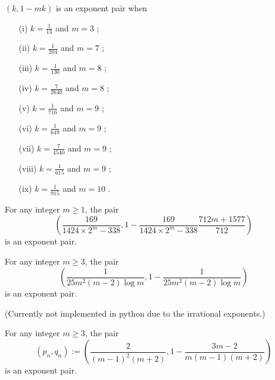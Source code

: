 \begin{theorem}\label{exp_pair_deriv_test} $(k,1-mk)$ is an exponent pair when
    \begin{itemize}
\item[(i)] $k=\frac{1}{13}$ and $m=3$ \cite[Theorem 1]{robert_fourth_2002};
\item[(ii)] $k = \frac{1}{204}$ and $m=7$ \cite[p. 231]{sargos_analog_2003};
\item[(iii)] $k = \frac{1}{130}$ and $m=8$ \cite[(1.1)]{robert_2002};
\item[(iv)] $k = \frac{7}{2640}$ and $m=8$ \cite[p. 231]{sargos_analog_2003};
\item[(v)] $k = \frac{1}{716}$ and $m=9$ \cite[p. 231]{sargos_analog_2003};
\item[(vi)] $k = \frac{1}{649}$ and $m=9$ \cite{Robert_Sargos_2001};
\item[(vii)] $k = \frac{7}{4540}$ and $m=9$ \cite[(1.2)]{robert_2002};
\item[(viii)] $k = \frac{1}{615}$ and $m=9$ \cite[(1.1)]{robert_2002};
\item[(ix)] $k = \frac{1}{915}$ and $m=10$ \cite[Th\'eor\`eme 2]{robert_2002b}.
\end{itemize}
\end{theorem}

\literature
{}


\begin{theorem}\label{huxley_exp_pair}\cite[Table 17.3]{huxley_area_1996}  For any integer $m \geq 1$, the pair
    $$ \left(\frac{169}{1424 \times 2^m - 338}, 1 - \frac{169}{1424 \times 2^m - 338} \frac{712m+1577}{712}\right)$$
is an exponent pair.
\end{theorem}

\literature
{}

\begin{theorem}\label{heath-brown_exp_pair_1996}\cite[(6.17.4)]{titchmarsh_theory_1986}  For any integer $m \geq 3$, the pair
$$ \left(\frac{1}{25m^2 (m-2) \log m}, 1 - \frac{1}{25 m^2 (m-2) \log m}\right)$$
is an exponent pair.
\end{theorem}

(Currently not implemented in python due to the irrational exponents.)

\begin{theorem}\label{heath-brown_exp_pair_2017}\cite[Theorem 2]{heathbrown_new_2017}
For any integer $m \geq 3$, the pair
$$ (p_n,q_n) := \left(\frac{2}{(m-1)^2(m+2)}, 1 - \frac{3m-2}{m(m-1)(m+2)}\right)$$
is an exponent pair.
\end{theorem}

